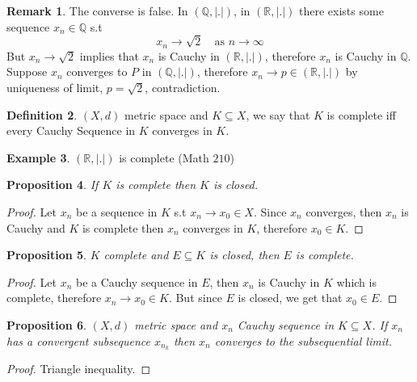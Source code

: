 \documentclass[11pt,a4paper]{article}
\theoremstyle{definition}
\newtheorem{definition}{Definition}[section]
\newtheorem{example}[definition]{Example}
\newtheorem{remark}[definition]{Remark}
\theoremstyle{plain}
\newtheorem{proposition}[definition]{Proposition}
\theoremstyle{remark}
\newcommand{\R}{\mathbb{R}}
\newcommand{\Q}{\mathbb{Q}}
\newcommand{\abs}[1]{\lvert #1 \rvert}
\begin{document}
\begin{remark}
    The converse is false. In $(\Q, \abs{.})$, in $(\R, \abs{.})$ there exists some sequence $x_n \in \Q$ s.t 
    $$x_n \to \sqrt{2} \quad \text{as } n \to \infty$$
    But $x_n \to \sqrt{2}$ implies that $x_n$ is Cauchy in $(\R, \abs{.})$, therefore $x_n$ is Cauchy in $\Q$. 
    Suppose $x_n$ converges to $P$ in $(\Q, \abs{.})$, therefore $x_n \to p \in (\R, \abs{.})$ by uniqueness of limit, 
    $p = \sqrt{2}$, contradiction. 
\end{remark}

\begin{definition}
    $(X, d)$ metric space and $K \subseteq X$, we say that $K$ is complete iff every Cauchy Sequence in $K$ converges in $K$.
\end{definition}

\begin{example}
    $(\R, \abs{.})$ is complete (Math $210$)
\end{example}

\begin{proposition}
    If $K$ is complete then $K$ is closed. 
\end{proposition}

\begin{proof}
    Let $x_n$ be a sequence in $K$ s.t $x_n \to x_0 \in X$. Since $x_n$ converges, then $x_n$ is Cauchy and $K$ is complete then 
    $x_n$ converges in $K$, therefore $x_0 \in K$.      
\end{proof}

\begin{proposition}
    $K$ complete and $E \subseteq K$ is closed, then $E$ is complete. 
\end{proposition}

\begin{proof}
    Let $x_n$ be a Cauchy sequence in $E$, then $x_n$ is Cauchy in $K$ which is complete, therefore $x_n \to x_0 \in K$. 
    But since $E$ is closed, we get that $x_0 \in E$. 
\end{proof}

\begin{proposition}
    $(X, d)$ metric space and $x_n$ Cauchy sequence in $K \subseteq X$. If $x_n$ has a convergent subsequence $x_{n_k}$ then $x_n$ converges to 
    the subsequential limit.  
\end{proposition}

\begin{proof}
    Triangle inequality. 
\end{proof}
\end{document}
